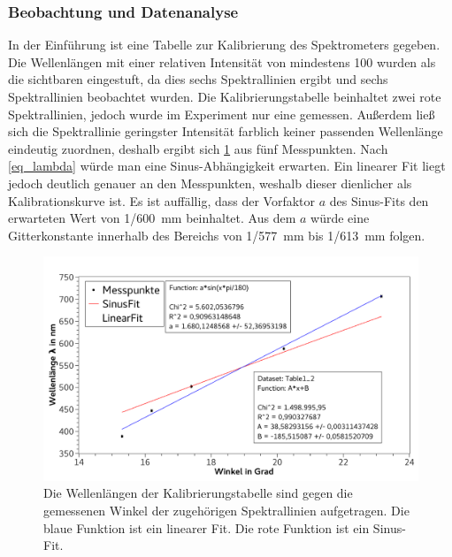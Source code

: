 \documentclass[
	a4paper,
	12pt,
	pagesize,
	ngerman
]{scrartcl}
\begin{document}
	\subsubsection{Beobachtung und Datenanalyse}
	In der Einführung ist eine Tabelle zur Kalibrierung des Spektrometers gegeben. %
	Die Wellenlängen mit einer relativen Intensität von mindestens 100 wurden als die sichtbaren eingestuft, da dies sechs Spektrallinien ergibt und sechs Spektrallinien beobachtet wurden. %
	Die Kalibrierungstabelle beinhaltet zwei rote Spektrallinien, jedoch wurde im Experiment nur eine gemessen.
	Außerdem ließ sich die Spektrallinie geringster Intensität farblich keiner passenden Wellenlänge eindeutig zuordnen, deshalb ergibt sich \cref{fig_helium} aus fünf Messpunkten. %
	Nach \cref{eq_lambda} würde man eine Sinus-Abhängigkeit erwarten. 
	Ein linearer Fit liegt jedoch deutlich genauer an den Messpunkten, weshalb dieser dienlicher als Kalibrationskurve ist.%
	Es ist auffällig, dass der Vorfaktor $a$ des Sinus-Fits den erwarteten Wert von 1/\SI{600}{mm} beinhaltet. 
	Aus dem $a$ würde eine Gitterkonstante innerhalb des Bereichs von 1/\SI{577}{mm} bis 1/\SI{613}{mm} folgen. %
	

	\begin{figure}[H] 
		\includegraphics[width=1\textwidth]{fig_helium} 
		\centering
		\caption{Die Wellenlängen der Kalibrierungstabelle sind gegen die gemessenen Winkel der zugehörigen Spektrallinien aufgetragen.
		Die blaue Funktion ist ein linearer Fit.
		Die rote Funktion ist ein Sinus-Fit.}
		\label{fig_helium}
		\centering
	\end{figure}
\end{document}

